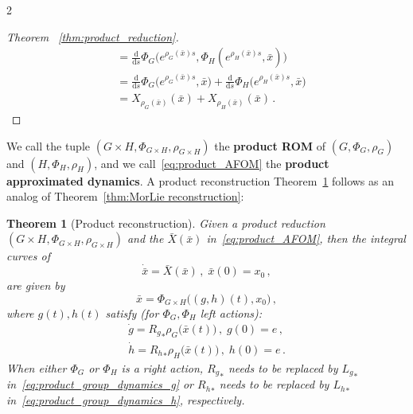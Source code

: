 \documentclass{article}
\newtheorem{theorem}{Theorem}[section]
\newtheorem{proof}{Proof}[theorem]
\newcommand{\appX}{\bar{X}}
\newcommand{\state}{x}
\newcommand{\appstate}{\bar{x}}
\newcommand{\ext}{\text{d}}                                 %
\begin{document}
\begin{multicols}{2}
\begin{proof}[Theorem ~\ref{thm:product_reduction}]
\begin{align*}
        &= \frac{\ext}{\ext s} \Phi_{G}\big(e^{\rho_{G}(\appstate)s},\Phi_{H}(e^{\rho_{H}(\appstate)s},\appstate)\big) \\
        &= \frac{\ext}{\ext s} \Phi_{G}\big(e^{\rho_{G}(\appstate)s},\appstate\big) + \frac{\ext}{\ext s} \Phi_{H}\big(e^{\rho_{H}(\appstate)s},\appstate\big) \\
        &=  X_{\rho_G(\appstate)}(\appstate) + X_{\rho_H(\appstate)}(\appstate) \,.
    \end{align*}
\end{proof}


We call the tuple $(G\times H, \Phi_{G\times H}, \rho_{G\times H})$ the \textbf{product ROM} of $(G,\Phi_G,\rho_G)$ and $(H,\Phi_H,\rho_H)$, and we call~\eqref{eq:product_AFOM} the \textbf{product approximated dynamics}. A product reconstruction Theorem~\ref{thm:product_reconstruction} follows as an analog of Theorem~\ref{thm:MorLie reconstruction}:

\begin{theorem}[Product reconstruction]\label{thm:product_reconstruction}
    Given a product reduction $(G\times H, \Phi_{G\times H}, \rho_{G\times H})$ and the $\appX(\appstate)$ in~\eqref{eq:product_AFOM}, then the integral curves of 
    \begin{equation}
        \dot{\appstate} = \appX(\appstate) \,,\; \appstate(0) = \state_0\,,
    \end{equation}
    are given by 
    \begin{equation}\label{eq:product_reconstruction}
        \appstate = \Phi_{G\times H}\big((g,h)(t),\state_0\big)\,,
    \end{equation}
    where $g(t),h(t)$ satisfy (for $\Phi_G,\Phi_H$ left actions):
    \begin{align} 
        \dot{g} = {R_g}_* \rho_G\big(\appstate(t)\big)\,,\; g(0) = e\,, \label{eq:product_group_dynamics_g}\\
        \dot{h} = {R_h}_* \rho_H\big(\appstate(t)\big)\,,\; h(0) = e\,. \label{eq:product_group_dynamics_h}
    \end{align}
    When either $\Phi_G$ or $\Phi_H$ is a right action, ${R_g}_*$ needs to be replaced by ${L_g}_*$ in~\eqref{eq:product_group_dynamics_g} or ${R_h}_*$ needs to be replaced by ${L_h}_*$ in~\eqref{eq:product_group_dynamics_h}, respectively.
\end{theorem}


\end{multicols}
\end{document}
